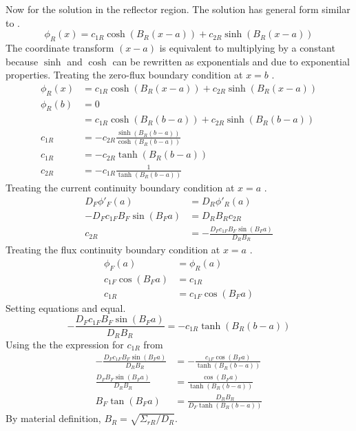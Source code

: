   Now for the solution in the reflector region. The solution has general form
  similar to .
  \begin{equation}
    \phi_R(x) = c_{1R} \cosh(B_R (x-a)) + c_{2R} \sinh(B_R (x-a))
  \end{equation}
  The coordinate transform $(x-a)$ is equivalent to multiplying by a constant 
  because $\sinh$ and $\cosh$ can be rewritten as exponentials and due to 
  exponential properties. Treating the zero-flux boundary condition at $x=b$ 
  .
  \begin{align}
    \phi_R(x) &= c_{1R} \cosh(B_R (x-a)) + c_{2R} \sinh(B_R (x-a))\\
    \phi_R(b) &= 0 \\
    &= c_{1R} \cosh(B_R(b-a)) + c_{2R} \sinh(B_R(b-a))\\
    c_{1R} &= -c_{2R} \frac{\sinh(B_R(b-a))}{\cosh(B_R(b-a))}\\
    c_{1R} &= -c_{2R} \tanh(B_R(b-a))\\
    c_{2R} &= -c_{1R} \frac{1}{\tanh(B_R(b-a))} \label{eq:c2rnumber1}
  \end{align}
  Treating the current continuity boundary condition at $x=a$ 
  .
  \begin{align}
    D_F \phi'_F(a) &= D_R \phi'_R(a) \\
    -D_F c_{1F} B_F \sin(B_F a) &= D_R B_R c_{2R} \\
    c_{2R} &= -\frac{D_F c_{1F} B_F \sin(B_F a)}{D_R B_R} \label{eq:c2rnumber2}
  \end{align}
  Treating the flux continuity boundary condition at $x=a$ 
  .
  \begin{align}
    \phi_F(a)&=\phi_R(a) \\
    c_{1F} \cos(B_F a) &= c_{1R} \\
    c_{1R} &= c_{1F} \cos(B_F a) \label{eq:c1r}
  \end{align}
  Setting equations  and  equal.
  \begin{equation}
    - \frac{D_F c_{1F} B_F \sin(B_F a)}{D_R B_R} = -c_{1R} \tanh(B_R(b-a))
  \end{equation}
  Using the the expression for $c_{1R}$ from 
  \begin{align}
    - \frac{D_F c_{1F} B_F \sin(B_F a)}{D_R B_R} &=
      - \frac{c_{1F} \cos(B_F a)}{\tanh(B_R(b-a))}\\
    \frac{D_F B_F \sin(B_F a)}{D_R B_R} &= 
      \frac{\cos(B_F a)}{\tanh(B_R(b-a))} \\
    B_F \tan(B_F a) &= \frac{D_R B_R}{D_F \tanh(B_R(b-a))}
  \end{align}
  By material definition,  ${B_R = \sqrt{\Sigma_{rR}/D_R}}$.
  

